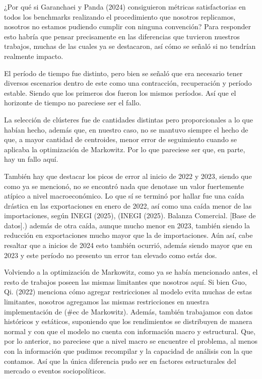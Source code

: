 \documentclass[
]{article}
\begin{document}
¿Por qué si Garanchaei y Panda (2024) consiguieron métricas satisfactorias en todos
los benchmarks realizando el procedimiento que nosotros replicamos, nosotros no
estamos pudiendo cumplir con ninguna convención? Para responder esto habría que
pensar precisamente en las diferencias que tuvieron nuestros trabajos, muchas de las
cuales ya se destacaron, así cómo se señaló si no tendrían realmente impacto.

El período de tiempo fue distinto, pero bien se señaló que era necesario tener diversos
escenarios dentro de este como una contracción, recuperación y período estable.
Siendo que los primeros dos fueron los mismos períodos. Así que el horizonte de
tiempo no pareciese ser el fallo.

La selección de clústeres fue de cantidades distintas pero proporcionales a lo que
habían hecho, además que, en nuestro caso, no se mantuvo siempre el hecho de que,
a mayor cantidad de centroides, menor error de seguimiento cuando se aplicaba la
optimización de Markowitz. Por lo que pareciese ser que, en parte, hay un fallo aquí.

También hay que destacar los picos de error al inicio de 2022 y 2023, siendo que como
ya se mencionó, no se encontró nada que denotase un valor fuertemente atípico a nivel
macroeconómico. Lo que sí se terminó por hallar fue una caída drástica en las
exportaciones en enero de 2022, así como una caída menor de las importaciones,
según INEGI (2025), (INEGI (2025). Balanza Comercial. [Base de datos].) además de
otra caída, aunque mucho menor en 2023, también siendo la reducción en
exportaciones mucho mayor que la de importaciones. Aún así, cabe resaltar que a
inicios de 2024 esto también ocurrió, además siendo mayor que en 2023 y este período
no presento un error tan elevado como estás dos.

Volviendo a la optimización de Markowitz, como ya se había mencionado antes, el
resto de trabajos poseen las mismas limitantes que nosotros aquí. Si bien Guo, Qi.
(2022) menciona cómo agregar restricciones al modelo evita muchas de estas
limitantes, nosotros agregamos las mismas restricciones en nuestra implementación
de (#ec de Markowitz). Además, también trabajamos con datos históricos y
estáticos, suponiendo que los rendimientos se distribuyen de manera normal y con
que el modelo no cuenta con información macro y estructural.
Que, por lo anterior, no pareciese que a nivel macro se encuentre el problema, al
menos con la información que pudimos recompilar y la capacidad de análisis con la
que contamos. Así que la única diferencia pudo ser en factores estructurales del
mercado o eventos sociopolíticos.
\end{document}

